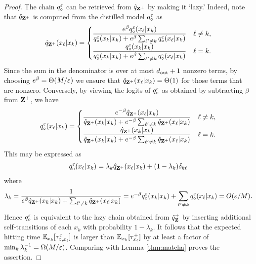 \begin{proof}
The chain $q_\circ^\varepsilon$ can be retrieved from $\hat{q}_{\mathbf{Z}^+}$ by making it `lazy.' Indeed, note that $\hat{q}_{\mathbf{Z}^+}$ is computed from the distilled model $q_\circ^\varepsilon$ as
\begin{align*}
\hat{q}_{\mathbf{Z}^+}(x_\ell|x_k) = \begin{cases}
\displaystyle \frac{e^\beta q_{\circ}^\varepsilon(x_\ell|x_k)}{q_{\circ}^\varepsilon(x_k|x_k) + e^\beta\sum_{\ell'\ne k} q_{\circ}^\varepsilon(x_\ell|x_k)} & \ell\ne k,\\
\displaystyle \frac{q_{\circ}^\varepsilon(x_k|x_k)}{q_{\circ}^\varepsilon(x_k|x_k) + e^\beta\sum_{\ell'\ne k} q_{\circ}^\varepsilon(x_\ell|x_k)} & \ell = k.
\end{cases}
\end{align*}
Since the sum in the denominator is over at most $d_{\operatorname{out}}+1$ nonzero terms, by choosing $e^\beta = \Theta(M/\varepsilon)$ we ensure that $\hat{q}_{\mathbf{Z}^+}(x_\ell|x_k) = \Theta(1)$ for those terms that are nonzero. Conversely, by viewing the logits of $q_\circ^\varepsilon$ as obtained by subtracting $\beta$ from $\mathbf{Z}^+$, we have
\begin{align*}
q_\circ^\varepsilon(x_\ell|x_k) = \begin{cases}
\displaystyle \frac{e^{-\beta} \hat{q}_{\mathbf{Z}^+}(x_\ell|x_k)}{\hat{q}_{\mathbf{Z}^+}(x_k|x_k) + e^{-\beta}\sum_{\ell'\ne k} \hat{q}_{\mathbf{Z}^+}(x_\ell|x_k)} & \ell\ne k,\\
\displaystyle \frac{\hat{q}_{\mathbf{Z}^+}(x_k|x_k)}{\hat{q}_{\mathbf{Z}^+}(x_k|x_k) + e^{-\beta}\sum_{\ell'\ne k} \hat{q}_{\mathbf{Z}^+}(x_\ell|x_k)} & \ell = k.
\end{cases}
\end{align*}
This may be expressed as
\begin{align*}
q_\circ^\varepsilon(x_\ell|x_k) = \lambda_k \hat{q}_{\mathbf{Z}^+}(x_\ell|x_k) + (1-\lambda_k) \delta_{k\ell}
\end{align*}
where
\begin{equation*}
\lambda_k = \frac{1}{e^\beta \hat{q}_{\mathbf{Z}^+}(x_k|x_k) + \sum_{\ell'\ne k} \hat{q}_{\mathbf{Z}^+}(x_\ell|x_k)} = e^{-\beta} q_\circ^\varepsilon(x_k|x_k) + \sum_{\ell'\ne k} q_\circ^\varepsilon(x_\ell|x_k) = O(\varepsilon/M).
\end{equation*}
Hence $q_\circ^\varepsilon$ is equivalent to the lazy chain obtained from $\hat{q}_{\mathbf{Z}}^+$ by inserting additional self-transitions of each $x_k$ with probability $1-\lambda_k$. It follows that the expected hitting time $\mathbb{E}_{x_k}[\tau_{\circ,x_\ell}^\varepsilon]$ is larger than $\mathbb{E}_{x_k}[\tau_{x_\ell}^+]$ by at least a factor of $\min_k \lambda_k^{-1} = \Omega(M/\varepsilon)$. Comparing with Lemma \ref{thm:matcha} proves the assertion.
\end{proof}


